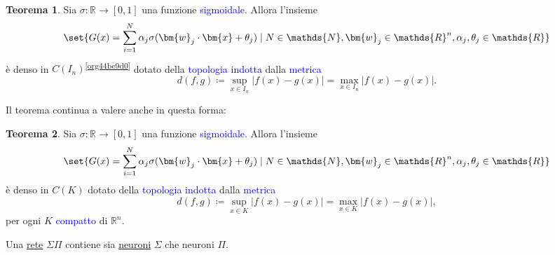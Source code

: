 \documentclass[10pt]{book}
\newcommand{\1}{\mathds{1}}
\newcommand{\R}{\mathds{R}}
\newcommand{\N}{\mathds{N}}
\theoremstyle{definition}%
\newtheorem{thm}{Teorema}[section]
\theoremstyle{plain}
\theoremstyle{remark}
\renewcommand{\href}[2]{\textcolor{blue}{#2}}
\begin{document}
\begin{thm}
Sia \(\sigma:\R\to [0,1]\) una funzione \href{../../../../../org/roam/20250625110110-funzione_sigmoidale.org}{sigmoidale}. Allora l'insieme
\begin{equation*}
\set{G(x) = \sum_{i =1}^{N}\alpha_{j}\sigma(\bm{w}_{j}\cdot \bm{x} + \theta_{j})\mid N \in \N, \bm{w}_{j} \in \R^{n}, \alpha_{j}, \theta_{j} \in \R}
\end{equation*}
è denso in \(C(I_{n})\)\textsuperscript{\ref{org44be9d0}} dotato della \href{../../../../../org/roam/20250103145124-topologia.org}{topologia} \href{../../../../../org/roam/20250301193530-topologia_indotta_da_una_distanza.org}{indotta} dalla \href{../../../../../org/roam/20250301193511-spazio_metrico.org}{metrica}
\begin{equation*}
d(f,g) \coloneqq \sup_{x \in I_{n}} |f(x)-g(x)| = \max_{x \in I_{n}}|f(x)-g(x)|.
\end{equation*}
\label{teo9.3.6}
\end{thm}

Il teorema continua a valere anche in questa forma:
\begin{thm}
Sia \(\sigma:\R\to [0,1]\) una funzione \href{../../../../../org/roam/20250625110110-funzione_sigmoidale.org}{sigmoidale}. Allora l'insieme
\begin{equation*}
\set{G(x) = \sum_{i =1}^{N}\alpha_{j}\sigma(\bm{w}_{j}\cdot \bm{x} + \theta_{j})\mid N \in \N, \bm{w}_{j} \in \R^{n}, \alpha_{j}, \theta_{j} \in \R}
\end{equation*}
è denso in \(C(K)\) dotato della \href{../../../../../org/roam/20250103145124-topologia.org}{topologia} \href{../../../../../org/roam/20250301193530-topologia_indotta_da_una_distanza.org}{indotta} dalla \href{../../../../../org/roam/20250301193511-spazio_metrico.org}{metrica}
\begin{equation*}
d(f,g) \coloneqq \sup_{x \in K} |f(x)-g(x)| = \max_{x \in K}|f(x)-g(x)|,
\end{equation*}
per ogni \(K\) \href{../../../../../org/roam/20250103163701-spazio_topologico_compatto.org}{compatto} di \(\R^{n}\).
\end{thm}
Una \hyperref[sec:org1346ff2]{rete} \(\Sigma\Pi\) contiene sia \hyperref[sec:org0026bd1]{neuroni} \(\Sigma\) che neuroni \(\Pi\).
\end{document}

